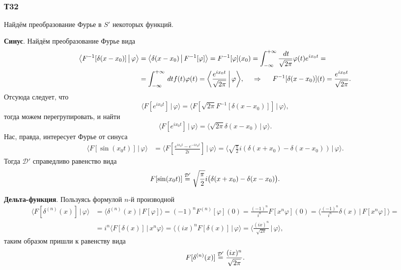 \subsubsection*{Т32}


Найдём преобразование Фурье в $S'$ некоторых функций.

\textbf{Синус}. Найдём преобразование Фурье вида
\begin{align*}
    \big\langle F^{-1}[\delta(x-x_0)] \,\big|\, \varphi \big\rangle &=
    \big\langle \delta(x-x_0) \,\big|\, F^{-1}[\varphi] \big\rangle  = 
    F^{-1} [\varphi] (x_0) = \int_{-\infty}^{+\infty} \frac{\, d t}{\sqrt{2\pi}} \varphi(t) e^{i x_0 t}  = \\
    &= \int_{-\infty}^{+\infty} \, d t  f(t) \varphi(t) = \bigg\langle \frac{e^{i x_0 t}}{\sqrt{2\pi}} \,\bigg|\,  \varphi\bigg\rangle ,
    \hspace{0.5cm} \Rightarrow \hspace{0.5cm}
    F^{-1}[\delta(x-x_0)] (t) = \frac{e^{i x_0 t}}{\sqrt{2\pi}}.
\end{align*}
Отсуюда следует, что
\begin{equation*}
    \big\langle F[e^{i x_0 t}] \,\big|\, \varphi \big\rangle = \big\langle F\left[\sqrt{2\pi} F^{-1} [\delta(x-x_0)]\right] \,\big|\, \varphi \big\rangle,
\end{equation*}
тогда можем перегрупировать, и найти
\begin{equation*}
    \big\langle F[e^{i x_0 t}]  \,\big|\, \varphi \big\rangle = \langle \sqrt{2\pi} \delta(x-x_0) \,|\, \varphi \rangle.
\end{equation*}
Нас, правда, интересует Фурье от синуса
\begin{align*}
    \langle F[\sin(x_0 t)] \,|\, \varphi \rangle &=
    \bigg\langle F\left[\frac{e^{i x_0 t}-e^{-i x_0 t}}{2 i}\right] \,\bigg|\, \varphi \bigg\rangle  = 
    \bigg\langle \sqrt{\frac{\pi}{2}} i \left(
        \delta(x+x_0) - \delta(x-x_0)
    \right) \,\bigg|\,  \varphi \bigg\rangle.
\end{align*}
Тогда $\mathcal D'$ справедливо равенство вида
\begin{equation*}
    F[\sin (x_0 t)] \overset{\mathcal D'}{=} \sqrt{\frac{\pi}{2}} i \big( 
        \delta(x+x_0) - \delta(x-x_0)
    \big).
\end{equation*}


\textbf{Дельта-функция}. Пользуясь формулой $n$-й производной
\begin{align*}
    \big\langle F[\delta^{(n)}(x)] \,\big|\, \varphi \big\rangle  &= \big\langle \delta^{(n)} (x) \,\big|\, F[\varphi] \big\rangle = 
    (-1)^n F^{(n)} [\varphi] (0) = \frac{(-1)^n}{i^n} F[x^n \varphi] (0) = 
    \bigg\langle \frac{(-1)^n}{i^n} \delta(x) \,\bigg|\, F[x^n \varphi] \bigg\rangle 
    = \\ &= 
    i^n \big\langle F[\delta(x)] \,\big|\, x^n \varphi \big\rangle = \langle (ix)^n F[\delta(x)] \,|\, \varphi \rangle = \bigg\langle \frac{(ix)^n}{\sqrt{2\pi}} \,\bigg|\, \varphi \bigg\rangle,
\end{align*}
таким образом пришли к равенству вида
\begin{equation*}
    F[\delta^{(n)} (x)] \overset{\mathcal D'}{=} \frac{(ix)^n}{\sqrt{2\pi}}.
\end{equation*}



